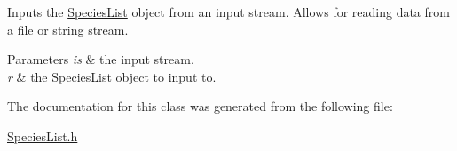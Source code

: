 Inputs the \hyperlink{class_species_list}{Species\+List} object from an input stream. Allows for reading data from a file or string stream. 


\begin{DoxyParams}{Parameters}
{\em is} & the input stream. \\
\hline
{\em r} & the \hyperlink{class_species_list}{Species\+List} object to input to. \\
\hline
\end{DoxyParams}


The documentation for this class was generated from the following file\+:\begin{DoxyCompactItemize}
\item 
\hyperlink{_species_list_8h}{Species\+List.\+h}\end{DoxyCompactItemize}
